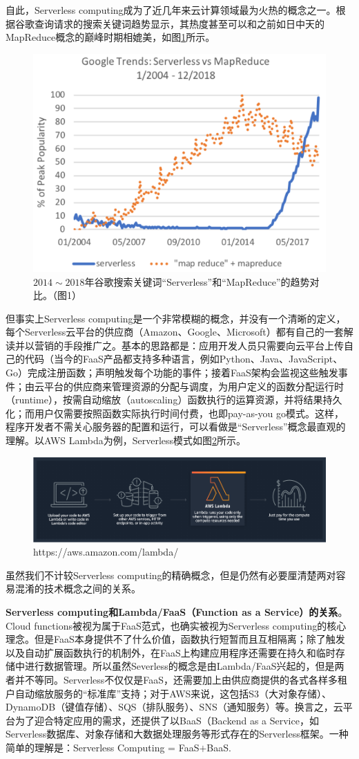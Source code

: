 \documentclass[11pt]{article}
\begin{document}
自此，Serverless computing成为了近几年来云计算领域最为火热的概念之一。根据谷歌查询请求的搜索关键词趋势显示，其热度甚至可以和之前如日中天的MapReduce概念的巅峰时期相媲美，如图\ref{figs:trend}所示。
\begin{figure}[!htbp]
	\centering
	\includegraphics[width=0.5\linewidth]{figs/trend}
	\caption{$ 2014\sim2018 $年谷歌搜索关键词``Serverless''和``MapReduce''的趋势对比。（\cite{hellerstein2018serverless}图1）}
	\label{figs:trend}
\end{figure}
但事实上Serverless computing是一个非常模糊的概念，并没有一个清晰的定义，每个Serverless云平台的供应商（Amazon、Google、Microsoft）都有自己的一套解读并以营销的手段推广之。基本的思路都是：应用开发人员只需要向云平台上传自己的代码（当今的FaaS产品都支持多种语言，例如Python、Java、JavaScript、Go）完成注册函数；声明触发每个功能的事件；接着FaaS架构会监视这些触发事件；由云平台的供应商来管理资源的分配与调度，为用户定义的函数分配运行时（runtime），按需自动缩放（autoscaling）函数执行的运算资源，并将结果持久化\cite{hellerstein2018serverless}；而用户仅需要按照函数实际执行时间付费，也即pay-as-you go模式。这样，程序开发者不需关心服务器的配置和运行，可以看做是``Serverless''概念最直观的理解。以AWS Lambda为例，Serverless模式如图\ref{figs:flow}所示。
\begin{figure}[!htbp]
	\centering
	\includegraphics[width=0.7\linewidth]{figs/flow}
	\caption{https://aws.amazon.com/lambda/}
	\label{figs:flow}
\end{figure}

虽然我们不计较Serverless computing的精确概念，但是仍然有必要厘清楚两对容易混淆的技术概念之间的关系。

\textbf{Serverless computing和Lambda/FaaS（Function as a Service）的关系}。Cloud functions被视为属于FaaS范式，也确实被视为Serverless computing的核心理念。但是FaaS本身提供不了什么价值，函数执行短暂而且互相隔离；除了触发以及自动扩展函数执行的机制外，在FaaS上构建应用程序还需要在持久和临时存储中进行数据管理\cite{hellerstein2018serverless}。所以虽然Severless的概念是由Lambda/FaaS兴起的，但是两者并不等同。Serverless不仅仅是FaaS，还需要加上由供应商提供的各式各样多租户自动缩放服务的``标准库''支持；对于AWS来说，这包括S3（大对象存储）、DynamoDB（键值存储）、SQS（排队服务）、SNS（通知服务）等\cite{hellerstein2018serverless}。换言之，云平台为了迎合特定应用的需求，还提供了以BaaS（Backend as a Service，如Serverless数据库、对象存储和大数据处理服务等形式存在的Serverless框架。一种简单的理解是：Serverless Computing = FaaS$ + $BaaS\cite{jonas2019cloud}.
\end{document}
